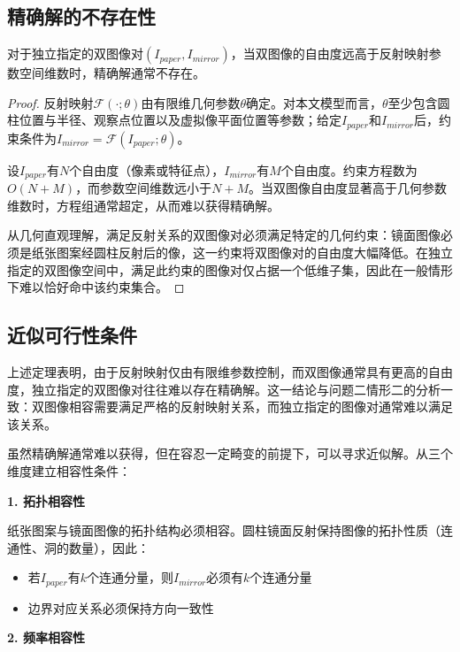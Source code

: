 \documentclass[withoutpreface]{cumcmthesis}
\begin{document}
\subsection{精确解的不存在性}

\begin{theorem}[一般不可行性]
对于独立指定的双图像对$(I_{paper}, I_{mirror})$，当双图像的自由度远高于反射映射参数空间维数时，精确解通常不存在。
\end{theorem}

\begin{proof}
反射映射$\mathcal{F}(\cdot;\theta)$由有限维几何参数$\theta$确定。对本文模型而言，$\theta$至少包含圆柱位置与半径、观察点位置以及虚拟像平面位置等参数；给定$I_{paper}$和$I_{mirror}$后，约束条件为$I_{mirror}=\mathcal{F}(I_{paper};\theta)$。

设$I_{paper}$有$N$个自由度（像素或特征点），$I_{mirror}$有$M$个自由度。约束方程数为$O(N+M)$，而参数空间维数远小于$N+M$。当双图像自由度显著高于几何参数维数时，方程组通常超定，从而难以获得精确解。

从几何直观理解，满足反射关系的双图像对必须满足特定的几何约束：镜面图像必须是纸张图案经圆柱反射后的像，这一约束将双图像对的自由度大幅降低。在独立指定的双图像空间中，满足此约束的图像对仅占据一个低维子集，因此在一般情形下难以恰好命中该约束集合。
\end{proof}

\subsection{近似可行性条件}

上述定理表明，由于反射映射仅由有限维参数控制，而双图像通常具有更高的自由度，独立指定的双图像对往往难以存在精确解。这一结论与问题二情形二的分析一致：双图像相容需要满足严格的反射映射关系，而独立指定的图像对通常难以满足该关系。

虽然精确解通常难以获得，但在容忍一定畸变的前提下，可以寻求近似解。从三个维度建立相容性条件：

\textbf{1. 拓扑相容性}

纸张图案与镜面图像的拓扑结构必须相容。圆柱镜面反射保持图像的拓扑性质（连通性、洞的数量），因此：
\begin{itemize}
    \item 若$I_{paper}$有$k$个连通分量，则$I_{mirror}$必须有$k$个连通分量
    \item 边界对应关系必须保持方向一致性
\end{itemize}

\textbf{2. 频率相容性}
\end{document}
